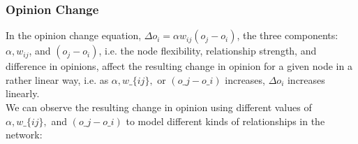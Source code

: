 \documentclass[11pt]{article}
\begin{document}
\subsubsection{Opinion Change}

In the opinion change equation,
\(\Delta o_i = \alpha w_{ij}(o_j - o_i)\), the three components:
$\alpha, w_{ij}$, and $(o_j - o_i)$, i.e. the node flexibility,
relationship strength, and difference in opinions, affect the resulting
change in opinion for a given node in a rather linear way, i.e. as
$\alpha, w\_\{ij\}, $ or $ (o\_j - o\_i)$ increases, \(\Delta o_i\)
increases linearly.\\

We can observe the resulting change in opinion using different values of
$\alpha, w\_\{ij\}, $ and $ (o\_j - o\_i)$ to model different kinds
of relationships in the network:
\end{document}
